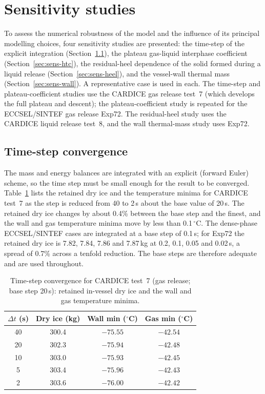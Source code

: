 \documentclass[5p,authoryear]{elsarticle}
\begin{document}
\section{Sensitivity studies}
\label{sec:sensitivity}

To assess the numerical robustness of the model and the influence of its principal modelling
choices, four sensitivity studies are presented: the time-step of the explicit integration
(Section~\ref{sec:sens-dt}), the plateau gas-liquid interphase coefficient
(Section~\ref{sec:sens-htc}), the residual-heel dependence of the solid formed during a liquid
release (Section~\ref{sec:sens-heel}), and the vessel-wall thermal mass
(Section~\ref{sec:sens-wall}). A representative case is used in each. The time-step and plateau-coefficient studies use the CARDICE
gas release test~7 (which develops the full plateau and descent); the plateau-coefficient study is
repeated for the ECCSEL/SINTEF gas release Exp72. The residual-heel study uses the CARDICE liquid
release test~8, and the wall thermal-mass study uses Exp72.

\subsection{Time-step convergence}
\label{sec:sens-dt}

The mass and energy balances are integrated with an explicit (forward Euler) scheme, so the time
step must be small enough for the result to be converged. Table~\ref{tab:sens-dt} lists the
retained dry ice and the temperature minima for CARDICE test~7 as the step is reduced from 40 to
2\,s about the base value of 20\,s. The retained dry ice changes by about 0.4\% between the base
step and the finest, and the wall and gas temperature minima move by less than 0.1\,$^\circ$C. The
dense-phase ECCSEL/SINTEF cases are integrated at a base step of 0.1\,s; for Exp72 the retained dry ice
is 7.82, 7.84, 7.86 and 7.87\,kg at 0.2, 0.1, 0.05 and 0.02\,s, a spread of 0.7\% across a tenfold
reduction. The base steps are therefore adequate and are used throughout.

\begin{table}[t!]
\centering
\small
\setlength{\tabcolsep}{4pt}
\caption{Time-step convergence for CARDICE test~7 (gas release; base step 20\,s): retained
in-vessel dry ice and the wall and gas temperature minima.}
\label{tab:sens-dt}
\begin{tabular}{cccc}
\toprule
$\Delta t$ (s) & Dry ice (kg) & Wall min ($^\circ$C) & Gas min ($^\circ$C) \\
\midrule
40 & 300.4 & $-75.55$ & $-42.54$ \\
20 & 302.3 & $-75.94$ & $-42.48$ \\
10 & 303.0 & $-75.93$ & $-42.45$ \\
5  & 303.4 & $-75.96$ & $-42.43$ \\
2  & 303.6 & $-76.00$ & $-42.42$ \\
\bottomrule
\end{tabular}
\end{table}
\end{document}
